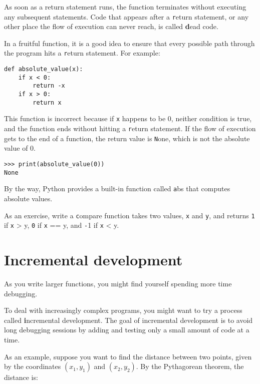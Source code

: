 \documentclass[
DIV=11,
fontsize=12,
twoside,
headinclude=false,
titlepage=firstiscover,
abstract=true,
headsepline=true,
footsepline=true,
chapterprefix=true, %
headings=big,
bibliography=totoc,%
captions=tableheading
]{scrbook}
\theoremstyle{definition}
\begin{document}
As soon as a return statement runs, the function
terminates without executing any subsequent statements.
Code that appears after a {\texttt return} statement, or any other place
the flow of execution can never reach, is called {\textbf dead code}.

In a fruitful function, it is a good idea to ensure
that every possible path through the program hits a
{\texttt return} statement.  For example:

\begin{lstlisting}
def absolute_value(x):
    if x < 0:
        return -x
    if x > 0:
        return x
\end{lstlisting}
%
This function is incorrect because if {\texttt x} happens to be 0,
neither condition is true, and the function ends without hitting a
{\texttt return} statement.  If the flow of execution gets to the end
of a function, the return value is {\texttt None}, which is not
the absolute value of 0.

\begin{lstlisting}
>>> print(absolute_value(0))
None
\end{lstlisting}
%
By the way, Python provides a built-in function called 
{\texttt abs} that computes absolute values.

As an exercise, write a {\texttt compare} function
takes two values, {\texttt x} and {\texttt y}, and returns {\texttt 1} if {\texttt x > y},
{\texttt 0} if {\texttt x == y}, and {\texttt -1} if {\texttt x < y}.


\section{Incremental development}
\label{incremental.development}

As you write larger functions, you might find yourself
spending more time debugging.

To deal with increasingly complex programs,
you might want to try a process called
{\textbf incremental development}.  The goal of incremental development
is to avoid long debugging sessions by adding and testing only
a small amount of code at a time.

As an example, suppose you want to find the distance between two
points, given by the coordinates $(x_1, y_1)$ and $(x_2, y_2)$.
By the Pythagorean theorem, the distance is:
\end{document}

